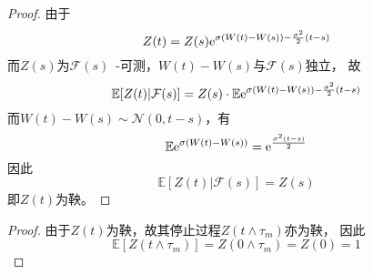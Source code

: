 \documentclass[cn]{homework}
\newcommand{\E}{\mathbb E}
\begin{document}
    \problem[习题3.7]
    \begin{subproblem}
        \item
        \begin{proof}
            由于
            \[Z(t)=Z(s)\mathrm e^{\sigma(W(t)-W(s))-\frac{\sigma^2}{2}(t-s)}\]
            而$Z(s)$为$\mathcal F(s)$~-可测，$W(t)-W(s)$与$\mathcal F(s)$独立，
            故
            \[\E[Z(t)|\mathcal F(s)]
            =Z(s)\cdot\E\e^{\sigma(W(t)-W(s))-\frac{\sigma^2}{2}(t-s)}\]
            而$W(t)-W(s)\sim\mathcal N(0,t-s)$，有
            \[\E\e^{\sigma(W(t)-W(s))}
            =\e^{\frac{\sigma^2(t-s)}{2}}\]
            因此
            \[\E[Z(t)|\mathcal F(s)]=Z(s)\]
            即$Z(t)$为鞅。
        \end{proof}

        \item
        \begin{proof}
            由于$Z(t)$为鞅，故其停止过程$Z(t\land\tau_m)$亦为鞅，
            因此
            \[\E[Z(t\land\tau_m)]=Z(0\land\tau_m)=Z(0)=1\]
        \end{proof}


\end{subproblem}
\end{document}

